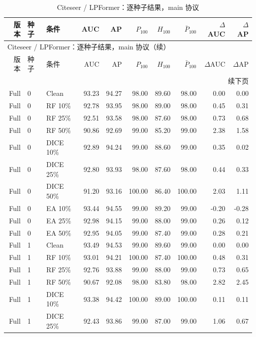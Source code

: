 {\footnotesize
\setlength{\tabcolsep}{3.2pt}
\renewcommand{\arraystretch}{1.10}
\begin{longtable}{rllrrrrrrr}
\caption{Citeseer / LPFormer：逐种子结果，main 协议}\\
\toprule
版本 & 种子 & 条件 & AUC & AP & $P_{100}$ & $H_{100}$ & $\bar P_{100}$ & $\Delta$AUC & $\Delta$AP \\
\midrule
\endfirsthead
\multicolumn{10}{l}{Citeseer / LPFormer：逐种子结果，main 协议（续）}\\
\toprule
版本 & 种子 & 条件 & AUC & AP & $P_{100}$ & $H_{100}$ & $\bar P_{100}$ & $\Delta$AUC & $\Delta$AP \\
\midrule
\endhead
\midrule\multicolumn{10}{r}{续下页}\\
\endfoot
\bottomrule
\endlastfoot
Full & 0 & Clean & 93.23 & 94.27 & 98.00 & 89.60 & 98.00 & 0.00 & 0.00 \\
Full & 0 & RF 10\% & 92.78 & 93.95 & 98.00 & 89.00 & 98.00 & 0.45 & 0.31 \\
Full & 0 & RF 25\% & 92.51 & 93.58 & 98.00 & 87.60 & 98.00 & 0.73 & 0.68 \\
Full & 0 & RF 50\% & 90.86 & 92.69 & 99.00 & 85.20 & 99.00 & 2.38 & 1.58 \\
Full & 0 & DICE 10\% & 92.89 & 94.24 & 99.00 & 88.60 & 99.00 & 0.35 & 0.02 \\
Full & 0 & DICE 25\% & 92.80 & 93.93 & 98.00 & 87.60 & 98.00 & 0.44 & 0.33 \\
Full & 0 & DICE 50\% & 91.20 & 93.16 & 100.00 & 86.40 & 100.00 & 2.03 & 1.11 \\
Full & 0 & EA 10\% & 93.44 & 94.55 & 99.00 & 89.20 & 99.00 & -0.20 & -0.28 \\
Full & 0 & EA 25\% & 92.98 & 94.15 & 99.00 & 88.00 & 99.00 & 0.26 & 0.12 \\
Full & 0 & EA 50\% & 92.95 & 94.05 & 99.00 & 87.40 & 99.00 & 0.28 & 0.21 \\
Full & 1 & Clean & 93.49 & 94.53 & 99.00 & 89.60 & 99.00 & 0.00 & 0.00 \\
Full & 1 & RF 10\% & 93.01 & 94.21 & 100.00 & 87.40 & 100.00 & 0.48 & 0.31 \\
Full & 1 & RF 25\% & 92.76 & 93.88 & 99.00 & 88.00 & 99.00 & 0.73 & 0.65 \\
Full & 1 & RF 50\% & 90.67 & 92.08 & 98.00 & 83.80 & 98.00 & 2.82 & 2.45 \\
Full & 1 & DICE 10\% & 93.38 & 94.42 & 100.00 & 89.00 & 100.00 & 0.11 & 0.11 \\
Full & 1 & DICE 25\% & 92.43 & 93.86 & 99.00 & 87.00 & 99.00 & 1.06 & 0.67 \\

\end{longtable}}
